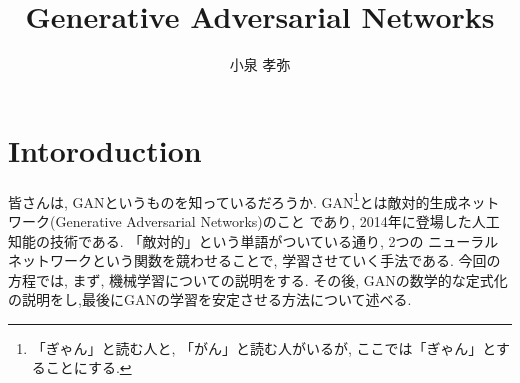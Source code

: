 \documentclass[11pt, a4paper, dvipdfmx]{jsarticle}
\title{Generative Adversarial Networks}
\author{小泉 孝弥}
\date{}
\theoremstyle{definition}
\begin{document}
\maketitle
\section{Intoroduction}
皆さんは, GANというものを知っているだろうか. GAN\footnote{「ぎゃん」と読む人と, 「がん」と読む人がいるが, ここでは「ぎゃん」とすることにする.}とは敵対的生成ネットワーク(Generative Adversarial Networks)のこと
であり, 2014年に登場した人工知能の技術である. 「敵対的」という単語がついている通り, 2つの
ニューラルネットワークという関数を競わせることで, 学習させていく手法である. 
今回の方程では, まず, 機械学習についての説明をする. その後, GANの数学的な定式化の説明をし,最後にGANの学習を安定させる方法について述べる.
\end{document}
